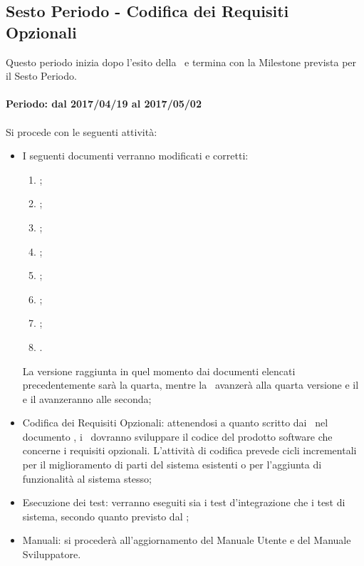\documentclass[../PianoDiProgetto_v4.0.0.tex]{subfiles}
\begin{document}
	\subsection{Sesto Periodo - Codifica dei Requisiti Opzionali}
	Questo periodo inizia dopo l'esito della \revisionediqualifica\ e termina con la Milestone prevista per il Sesto Periodo.
	\\
	\\
	\textbf{Periodo: dal 2017/04/19 al 2017/05/02}
	\\
	\\
	Si procede con le seguenti attività:
	\begin{itemize}
		\item I seguenti documenti verranno modificati e corretti:
			\begin{enumerate}
				\item \normediprogetto;
				\item \analisideirequisiti;
				\item \pianodiqualifica;
				\item \pianodiprogetto;
				\item {};
				\item \manualeutente;
				\item \manualesviluppatore;
				\item \glossario.
			\end{enumerate}

		La versione raggiunta in quel momento dai documenti elencati precedentemente sarà la quarta, mentre la \ avanzerà alla quarta versione e il \manualeutente e il \manualesviluppatore avanzeranno alle seconda;
		\item Codifica dei Requisiti Opzionali: attenendosi a quanto scritto dai \progettisti\ nel documento , i \programmatori\ dovranno sviluppare il codice del prodotto software che concerne i requisiti opzionali. L'attività di codifica prevede cicli incrementali per il miglioramento di parti del sistema esistenti o per l'aggiunta di funzionalità al sistema stesso;
		\item Esecuzione dei test: verranno eseguiti sia i test d'integrazione che i test di sistema, secondo quanto previsto dal \pianodiqualifica;
		\item Manuali: si procederà all'aggiornamento del Manuale Utente e del Manuale Sviluppatore.
	\end{itemize}
	
\end{document}
